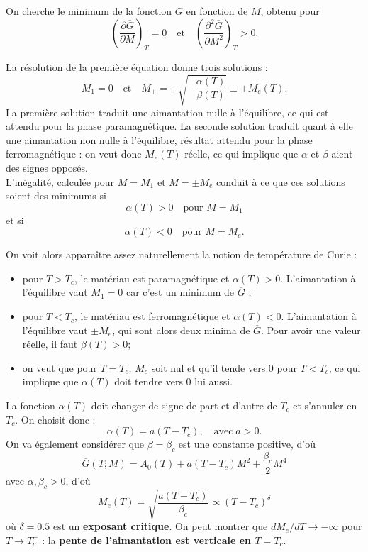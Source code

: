 \documentclass[11pt,a4paper]{report}
\begin{document}
On cherche le minimum de la fonction $\overline{G}$ en fonction de $M$, obtenu pour
\begin{equation}
	\left(\frac{\partial \overline{G}}{\partial M}\right)_T = 0
	\quad\text{et}\quad
	\left(\frac{\partial^2 \overline{G}}{\partial M^2}\right)_T > 0.
\end{equation}

La résolution de la première équation donne trois solutions :
\begin{equation}
	M_1 = 0 \quad\text{et}\quad M_\pm = \pm\sqrt{-\frac{\alpha(T)}{\beta(T)}} \equiv \pm M_e(T).
\end{equation}
La première solution traduit une aimantation nulle à l'équilibre, ce qui est attendu pour la phase paramagnétique. La seconde solution traduit quant à elle une aimantation non nulle à l'équilibre, résultat attendu pour la phase ferromagnétique : on veut donc $M_e(T)$ réelle, ce qui implique que $\alpha$ et $\beta$ aient des signes opposés.\\

L'inégalité, calculée pour $M = M_1$ et $M = \pm M_e$ conduit à ce que ces solutions soient des minimums si
\begin{equation}
	\alpha(T) > 0 \quad\text{pour } M = M_1
\end{equation}
et si
\begin{equation}
	\alpha(T) < 0 \quad\text{pour } M = M_e.
\end{equation}

On voit alors apparaître assez naturellement la notion de température de Curie :
\begin{itemize}
	\item pour $T > T_c$, le matériau est paramagnétique et $\alpha(T) > 0$. L'aimantation à 			l'équilibre vaut $M_1 = 0$ car c'est un minimum de $\overline{G}$ ;
	\item pour $T < T_c$, le matériau est ferromagnétique et $\alpha(T) < 0$. L'aimantation à 			l'équilibre vaut $\pm M_e$, qui sont alors deux minima de $\overline{G}$. Pour avoir une valeur 	réelle, il faut $\beta(T) > 0$;
	\item on veut que pour $T = T_c$, $M_e$ soit nul et qu'il tende vers 0 pour $T<T_c$, ce qui 		implique que $\alpha(T)$ doit tendre vers 0 lui aussi.
\end{itemize}
La fonction $\alpha(T)$ doit changer de signe de part et d'autre de $T_c$ et s'annuler en $T_c$. On choisit donc :
\begin{equation}
	\alpha(T) = a(T-T_c), \quad\text{avec}\;a>0.
\end{equation}
On va également considérer que $\beta = \beta_c$ est une constante positive, d'où
\begin{equation}
	\overline{G}(T;M) = A_0(T) + a\left(T-T_c\right)M^2 + \frac{\beta_c}{2}M^4
\end{equation}
avec $\alpha, \beta_c > 0$, d'où
\begin{equation}
	M_e(T) = \sqrt{\frac{a(T-T_c)}{\beta_c}} \propto (T-T_c)^\delta
\end{equation}
où $\delta = 0.5$ est un \textbf{exposant critique}. On peut montrer que $dM_e/dT \rightarrow -\infty$ pour $T\rightarrow T_c^-$ : la \textbf{pente de l'aimantation est verticale en $T = T_c$}.
\end{document}
